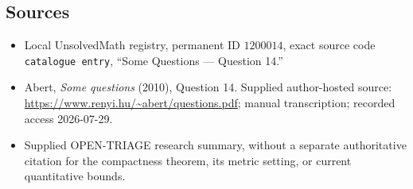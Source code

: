 \documentclass[11pt]{article}
\begin{document}
\subsection{Sources}
\begin{itemize}
\item Local UnsolvedMath registry, permanent ID \(1200014\), exact source code \texttt{catalogue entry}, ``Some Questions --- Question 14.''
\item Abert, \emph{Some questions} (2010), Question 14. Supplied author-hosted source: \url{https://www.renyi.hu/~abert/questions.pdf}; manual transcription; recorded access 2026-07-29.
\item Supplied OPEN-TRIAGE research summary, without a separate authoritative citation for the compactness theorem, its metric setting, or current quantitative bounds.
\end{itemize}
\end{document}
